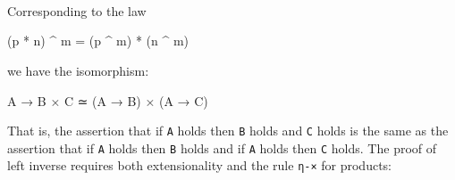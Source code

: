 \begin{fence}
\begin{code}
\AgdaSymbol{\}}\AgdaSpace{}%
\AgdaSymbol{\}}\<%
\\
%
\>[4]\AgdaSymbol{;}\AgdaSpace{}%
\AgdaSpace{}%
\AgdaSymbol{=}\AgdaSpace{}%
\AgdaSpace{}%
\AgdaSpace{}%
\AgdaSpace{}%
\AgdaSpace{}%
\AgdaSpace{}%
\AgdaSymbol{(}\AgdaSpace{}%
\AgdaSymbol{)}\AgdaSpace{}%
\AgdaSpace{}%
\AgdaSpace{}%
\AgdaSymbol{;}\AgdaSpace{}%
\AgdaSymbol{(}\AgdaSpace{}%
\AgdaSymbol{)}\AgdaSpace{}%
\AgdaSpace{}%
\AgdaSpace{}%
\AgdaSymbol{\}}\AgdaSpace{}%
\AgdaSymbol{\}}\<%
\\
%
\>[4]\AgdaSymbol{;}\AgdaSpace{}%
\AgdaSpace{}%
\AgdaSymbol{=}\AgdaSpace{}%
\AgdaSpace{}%
\AgdaSpace{}%
\AgdaSpace{}%
\AgdaOperator{\AgdaInductiveConstructor{,}}\AgdaSpace{}%
\AgdaSpace{}%
\AgdaSpace{}%
\AgdaSpace{}%
\AgdaSpace{}%
\AgdaSymbol{\}}\<%
\\
%
\>[4]\AgdaSymbol{\}}\<%
\end{code}
\end{fence}

Corresponding to the law

\begin{myDisplay}
(p * n) ^ m = (p ^ m) * (n ^ m)
\end{myDisplay}

we have the isomorphism:

\begin{myDisplay}
A → B × C  ≃  (A → B) × (A → C)
\end{myDisplay}

That is, the assertion that if \texttt{A} holds then \texttt{B} holds
and \texttt{C} holds is the same as the assertion that if \texttt{A}
holds then \texttt{B} holds and if \texttt{A} holds then \texttt{C}
holds. The proof of left inverse requires both extensionality and the
rule \texttt{η-×} for products:

